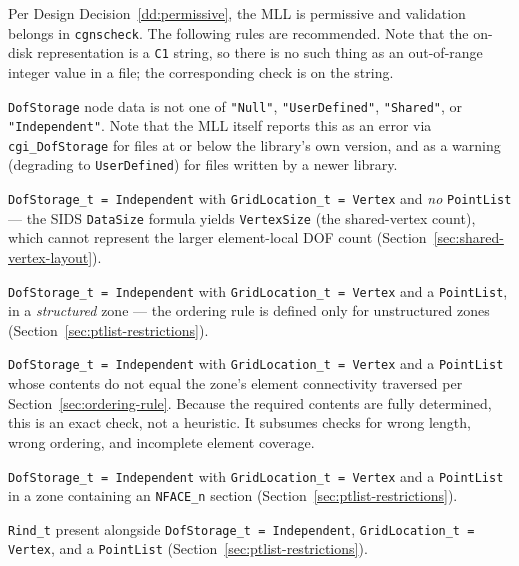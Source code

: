 \documentclass[11pt,letterpaper]{article}
\begin{document}
Per Design Decision~\ref{dd:permissive}, the MLL is permissive and
validation belongs in \texttt{cgnscheck}.  The following rules are
recommended.  Note that the on-disk representation is a \texttt{C1}
string, so there is no such thing as an out-of-range integer value in
a file; the corresponding check is on the string.

\begin{description}[leftmargin=2em]

\item[Error:] \texttt{DofStorage} node data is not one of
  \texttt{"Null"}, \texttt{"UserDefined"}, \texttt{"Shared"}, or
  \texttt{"Independent"}.  Note that the MLL itself reports this as an
  error via \texttt{cgi\_DofStorage} for files at or below the
  library's own version, and as a warning (degrading to
  \texttt{UserDefined}) for files written by a newer library.

\item[Error:] \texttt{DofStorage\_t = Independent} with
  \texttt{GridLocation\_t = Vertex} and \emph{no}
  \texttt{PointList} --- the SIDS \texttt{DataSize} formula yields
  \texttt{VertexSize} (the shared-vertex count), which cannot
  represent the larger element-local DOF count
  (Section~\ref{sec:shared-vertex-layout}).

\item[Error:] \texttt{DofStorage\_t = Independent} with
  \texttt{GridLocation\_t = Vertex} and a \texttt{PointList}, in a
  \emph{structured} zone --- the ordering rule is defined only for
  unstructured zones (Section~\ref{sec:ptlist-restrictions}).

\item[Error:] \texttt{DofStorage\_t = Independent} with
  \texttt{GridLocation\_t = Vertex} and a \texttt{PointList} whose
  contents do not equal the zone's element connectivity traversed per
  Section~\ref{sec:ordering-rule}.  Because the required contents are
  fully determined, this is an exact check, not a heuristic.  It
  subsumes checks for wrong length, wrong ordering, and incomplete
  element coverage.

\item[Error:] \texttt{DofStorage\_t = Independent} with
  \texttt{GridLocation\_t = Vertex} and a \texttt{PointList} in a zone
  containing an \texttt{NFACE\_n} section
  (Section~\ref{sec:ptlist-restrictions}).

\item[Error:] \texttt{Rind\_t} present alongside
  \texttt{DofStorage\_t = Independent},
  \texttt{GridLocation\_t = Vertex}, and a \texttt{PointList}
  (Section~\ref{sec:ptlist-restrictions}).


\end{description}
\end{document}
